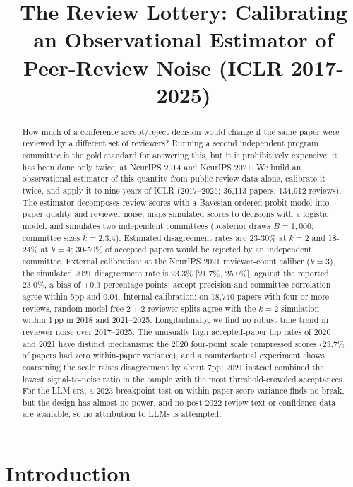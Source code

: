 \documentclass[10pt]{article}
\title{The Review Lottery: Calibrating an Observational Estimator of Peer-Review Noise (ICLR 2017-2025)}
\begin{document}
\maketitle

\begin{abstract}
How much of a conference accept/reject decision would change if the same paper were reviewed by a different set of reviewers? Running a second independent program committee is the gold standard for answering this, but it is prohibitively expensive: it has been done only twice, at NeurIPS 2014 and NeurIPS 2021. We build an observational estimator of this quantity from public review data alone, calibrate it twice, and apply it to nine years of ICLR (2017--2025; 36,113 papers, 134,912 reviews). The estimator decomposes review scores with a Bayesian ordered-probit model into paper quality and reviewer noise, maps simulated scores to decisions with a logistic model, and simulates two independent committees (posterior draws $B=1{,}000$; committee sizes $k=2$,3,4). Estimated disagreement rates are 23-30\% at $k=2$ and 18-24\% at $k=4$; 30-50\% of accepted papers would be rejected by an independent committee. External calibration: at the NeurIPS 2021 reviewer-count caliber ($k=3$), the simulated 2021 disagreement rate is 23.3\% [21.7\%, 25.0\%], against the reported 23.0\%, a bias of +0.3 percentage points; accept precision and committee correlation agree within 5pp and 0.04. Internal calibration: on 18,740 papers with four or more reviews, random model-free $2{+}2$ reviewer splits agree with the $k=2$ simulation within 1\,pp in 2018 and 2021--2025. Longitudinally, we find no robust time trend in reviewer noise over 2017--2025. The unusually high accepted-paper flip rates of 2020 and 2021 have distinct mechanisms: the 2020 four-point scale compressed scores (23.7\% of papers had zero within-paper variance), and a counterfactual experiment shows coarsening the scale raises disagreement by about 7pp; 2021 instead combined the lowest signal-to-noise ratio in the sample with the most threshold-crowded acceptances. For the LLM era, a 2023 breakpoint test on within-paper score variance finds no break, but the design has almost no power, and no post-2022 review text or confidence data are available, so no attribution to LLMs is attempted.
\end{abstract}

\section{Introduction}
\end{document}
